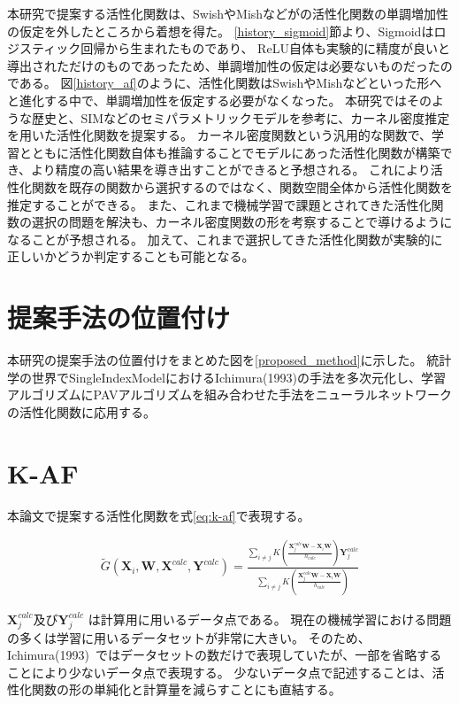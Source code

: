 本研究で提案する活性化関数は、SwishやMishなどがの活性化関数の単調増加性の仮定を外したところから着想を得た。
\ref{history_sigmoid}節より、Sigmoidはロジスティック回帰から生まれたものであり、
ReLU自体も実験的に精度が良いと導出されただけのものであったため、単調増加性の仮定は必要ないものだったのである。
図\ref{history_af}のように、活性化関数はSwishやMishなどといった形へと進化する中で、単調増加性を仮定する必要がなくなった。
本研究ではそのような歴史と、SIMなどのセミパラメトリックモデルを参考に、カーネル密度推定を用いた活性化関数を提案する。
カーネル密度関数という汎用的な関数で、学習とともに活性化関数自体も推論することでモデルにあった活性化関数が構築でき、より精度の高い結果を導き出すことができると予想される。
これにより活性化関数を既存の関数から選択するのではなく、関数空間全体から活性化関数を推定することができる。
また、これまで機械学習で課題とされてきた活性化関数の選択の問題を解決も、カーネル密度関数の形を考察することで導けるようになることが予想される。
加えて、これまで選択してきた活性化関数が実験的に正しいかどうか判定することも可能となる。



\section{提案手法の位置付け}
\label {position_proposed}

本研究の提案手法の位置付けをまとめた図を\ref{proposed_method}に示した。
統計学の世界でSingleIndexModelにおけるIchimura(1993)の手法を多次元化し、学習アルゴリズムにPAVアルゴリズムを組み合わせた手法をニューラルネットワークの活性化関数に応用する。



\section{K-AF}
\label {math}
本論文で提案する活性化関数を式\ref{eq:k-af}で表現する。

\begin{eqnarray}
\tilde{G}(\mathbf{X}_i, \mathbf{W}, \mathbf{X}^{calc}, \mathbf{Y}^{calc})=\frac{\sum_{i\neq j} K\left(\frac{\mathbf{X}^{calc}_j \mathbf{W} - \mathbf{X}_i \mathbf{W}}{h_{calc}}\right)\mathbf{Y}^{calc}_j}{\sum_{i\neq j} K\left(\frac{\mathbf{X}^{calc}_j \mathbf{W} - \mathbf{X}_i \mathbf{W}}{h_{calc}}\right)}
\label{eq:k-af}
\end{eqnarray}


$ \mathbf{X}^{calc}_j $及び$ \mathbf{Y}^{calc}_j $ は計算用に用いるデータ点である。
現在の機械学習における問題の多くは学習に用いるデータセットが非常に大きい。
そのため、Ichimura(1993)~\cite{ichimura}ではデータセットの数だけで表現していたが、一部を省略することにより少ないデータ点で表現する。
少ないデータ点で記述することは、活性化関数の形の単純化と計算量を減らすことにも直結する。


